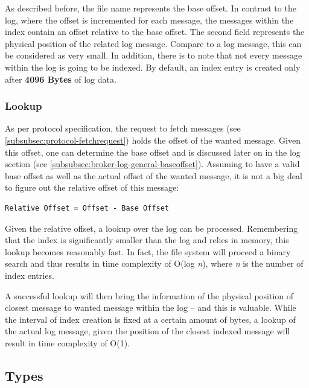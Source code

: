 As described before, the file name represents the base offset. In contrast to
the log, where the offset is incremented for each message, the messages within
the index contain an offset relative to the base offset. The second field
represents the physical position of the related log message. Compare to a log
message, this can be considered as very small. In addition, there is to note
that not every message within the log is going to be indexed. By default, an
index entry is created only after \textbf{4096 Bytes} of log data.

\subsubsection{Lookup}

As per protocol specification, the request to fetch messages (see
\ref{subsubsec:protocol-fetchrequest}) holds the offset of the wanted message.
Given this offset, one can determine the base offset and is discussed later on
in the log section (see \ref{subsubsec:broker-log-general-baseoffset}).
Assuming to have a valid base offset as well as the actual offset of the wanted
message, it is not a big deal to figure out the relative offset of this
message:

\begin{verbatim}
Relative Offset = Offset - Base Offset
\end{verbatim}

Given the relative offset, a lookup over the log can be processed. Remembering
that the index is significantly smaller than the log and relies in memory, this
lookup becomes reasonably fast. In fact, the file system will proceed a binary
search and thus results in time complexity of O(log \textit{n}), where
\textit{n} is the number of index entries.

A successful lookup will then bring the information of the physical position of
closest message to wanted message within the log -- and this is valuable. While
the interval of index creation is fixed at a certain amount of bytes, a lookup
of the actual log message, given the position of the closest indexed message
will result in time complexity of O(1).

\subsection{Types}

